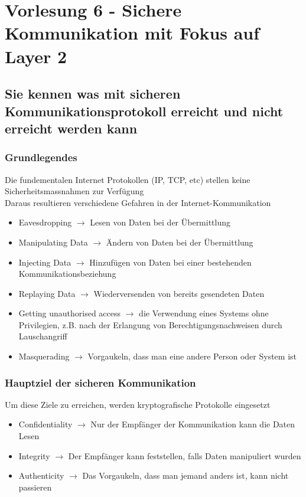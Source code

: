 \documentclass{report}
\theoremstyle{definition}
\theoremstyle{example}
\begin{document}
\chapter{Vorlesung 6 - Sichere Kommunikation mit Fokus auf Layer 2}

\section{Sie kennen was mit sicheren Kommunikationsprotokoll erreicht und nicht erreicht werden kann}
	\subsection{Grundlegendes}
Die fundementalen Internet Protokollen (IP, TCP, etc) stellen keine Sicherheitsmassnahmen zur Verfügung\\
Daraus resultieren verschiedene Gefahren in der Internet-Kommunikation
\begin{itemize}
	\item Eavesdropping $\rightarrow$ Lesen von Daten bei der Übermittlung
	\item Manipulating Data $\rightarrow$ Ändern von Daten bei der Übermittlung
	\item Injecting Data $\rightarrow$ Hinzufügen von Daten bei einer bestehenden Kommunikationsbeziehung
	\item Replaying Data $\rightarrow$ Wiederversenden von bereits gesendeten Daten
	\item Getting unauthorised access $\rightarrow$ die Verwendung eines Systems ohne Privilegien, z.B. nach der Erlangung von Berechtigungsnachweisen durch Lauschangriff
	\item Masquerading $\rightarrow$ Vorgaukeln, dass man eine andere Person oder System ist
\end{itemize}

	\subsection{Hauptziel der sicheren Kommunikation}
	Um diese Ziele zu erreichen, werden kryptografische Protokolle eingesetzt
	\begin{itemize}
		\item Confidentiality $\rightarrow$ Nur der Empfänger der Kommunikation kann die Daten Lesen
		\item Integrity $\rightarrow$ Der Empfänger kann feststellen, falls Daten manipuliert wurden
		\item Authenticity $\rightarrow$ Das Vorgaukeln, dass man jemand anders ist, kann nicht passieren
	\end{itemize}
\end{document}
